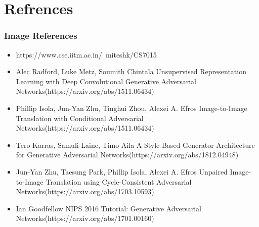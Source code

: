 \section{Refrences}
\begin{frame}
    \frametitle{Image References}
    	
    \begin{itemize}
        \item \hypertarget{miteshk}{https://www.cse.iitm.ac.in/~miteshk/CS7015}
    	
    	\item \hypertarget{DCGAN}{Alec Radford, Luke Metz, Soumith Chintala Unsupervised Representation Learning with Deep Convolutional Generative Adversarial Networks(https://arxiv.org/abs/1511.06434)}
    
        \item \hypertarget{CAN}{Phillip Isola, Jun-Yan Zhu, Tinghui Zhou, Alexei A. Efros Image-to-Image Translation with Conditional Adversarial Networks(https://arxiv.org/abs/1511.06434)}
    
        \item \hypertarget{StyleGAN}{Tero Karras, Samuli Laine, Timo Aila A Style-Based Generator Architecture for Generative Adversarial Networks(https://arxiv.org/abs/1812.04948)}
    
        \item \hypertarget{CycleGAN}{Jun-Yan Zhu, Taesung Park, Phillip Isola, Alexei A. Efros Unpaired Image-to-Image Translation using Cycle-Consistent Adversarial Networks(https://arxiv.org/abs/1703.10593)}

        \item \hypertarget{GAN}{Ian Goodfellow NIPS 2016 Tutorial: Generative Adversarial Networks(https://arxiv.org/abs/1701.00160)}
        
    \end{itemize}	
\end{frame}